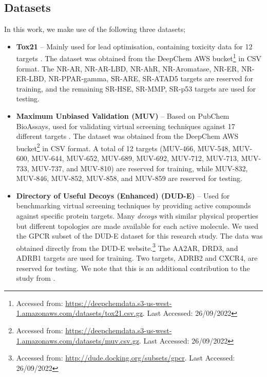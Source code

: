 \subsection{Datasets}

In this work, we make use of the following three datasets;

\begin{itemize}
    
    \item \textbf{Tox21} \citep{huang2016tox21challenge} -- Mainly used for lead optimisation, containing toxicity data for 12 targets \citep{tox21}. The dataset was obtained from the DeepChem AWS bucket\footnote{Accessed from: \url{https://deepchemdata.s3-us-west-1.amazonaws.com/datasets/tox21.csv.gz}. Last Accessed: 26/09/2022} in CSV format. The NR-AR, NR-AR-LBD, NR-AhR, NR-Aromatase, NR-ER, NR-ER-LBD, NR-PPAR-gamma, SR-ARE, SR-ATAD5 targets are reserved for training, and the remaining SR-HSE, SR-MMP, SR-p53 targets are used for testing.
    
    \item \textbf{Maximum Unbiased Validation (MUV)} \citep{rohrer2009maximum} -- Based on PubChem BioAssays, used for validating virtual screening techniques against 17 different targets \citep{rohrer2009maximum}. The dataset was obtained from the DeepChem AWS bucket\footnote{Accessed from: \url{https://deepchemdata.s3-us-west-1.amazonaws.com/datasets/muv.csv.gz}. Last Accessed: 26/09/2022} in CSV format. A total of 12 targets (MUV-466, MUV-548, MUV-600, MUV-644, MUV-652, MUV-689, MUV-692, MUV-712, MUV-713, MUV-733, MUV-737, and MUV-810) are reserved for training, while MUV-832, MUV-846, MUV-852, MUV-858, and MUV-859 are reserved for testing.
    
    \item \textbf{Directory of Useful Decoys (Enhanced) (DUD-E)} \cite{mysinger2012directory} -- Used for benchmarking virtual screening techniques by providing active compounds against specific protein targets. Many \textit{decoys} with similar physical properties but different topologies are made available for each active molecule. We used the GPCR subset of the DUD-E dataset \citep{mysinger2012directory} for this research study. The data was obtained directly from the DUD-E website.\footnote{Accessed from: \url{http://dude.docking.org/subsets/gpcr}. Last Accessed: 26/09/2022} The AA2AR, DRD3, and ADRB1 targets are used for training. Two targets, ADRB2 and CXCR4, are reserved for testing. We note that this is an additional contribution to the study from \citet{altae2017low}.
\end{itemize}

